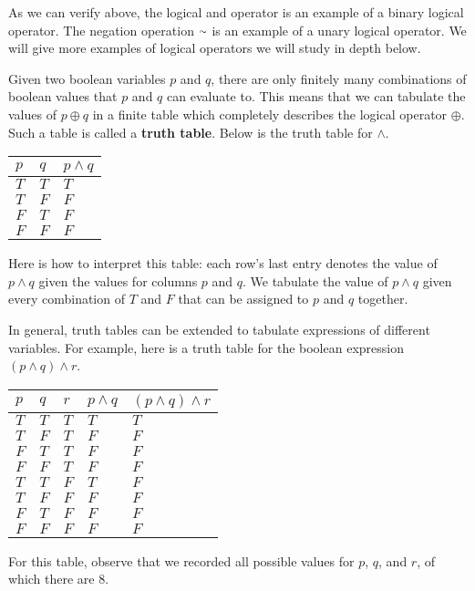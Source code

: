 As we can verify above, the logical and operator is an example of a binary logical operator. The negation operation $\shortsim$ is an example of a unary logical operator. We will give more examples of logical operators we will study in depth below. 

Given two boolean variables $p$ and $q$, there are only finitely many combinations of boolean values that $p$ and $q$ can evaluate to. This means that we can tabulate the values of $p \oplus q$ in a finite table which completely describes the logical operator $\oplus$. Such a table is called a \textbf{truth table}. Below is the truth table for $\land$.

\begin{table}[]
\centering
\begin{tabular}{|l|l|l|}
\hline
$p$ & $q$ & $p \land q$ \\ \hline
$T$ & $T$ & $T$         \\ \hline
$T$ & $F$ & $F$         \\ \hline
$F$ & $T$ & $F$         \\ \hline
$F$ & $F$ & $F$         \\ \hline
\end{tabular}
\end{table}

Here is how to interpret this table: each row's last entry denotes the value of $p \land q$ given the values for columns $p$ and $q$. We tabulate the value of $p \land q$ given every combination of $T$ and $F$ that can be assigned to $p$ and $q$ together.

In general, truth tables can be extended to tabulate expressions of different variables. For example, here is a truth table for the boolean expression $(p \land q) \land r$.

\begin{table}[]
\centering
\begin{tabular}{|l|l|l|l|l|}
\hline
$p$ & $q$ & $r$ & $p \land q$ & $(p \land q) \land r$ \\ \hline
$T$ & $T$ & $T$ & $T$   &   $T$   \\ \hline
$T$ & $F$ & $T$ &$F$    &   $F$  \\ \hline
$F$ & $T$ & $T$ &$F$    &   $F$  \\ \hline
$F$ & $F$ & $T$ &$F$    &    $F$ \\ \hline
$T$ & $T$ &$F$ &$T$   &     $F$ \\ \hline
$T$ & $F$ &$F$ &$F$    &     $F$ \\ \hline
$F$ & $T$ & $F$&$F$    &    $F$  \\ \hline
$F$ & $F$ & $F$&$F$    &     $F$ \\ \hline
\end{tabular}
\end{table}

For this table, observe that we recorded all possible values for $p$, $q$, and $r$, of which there are $8$.
